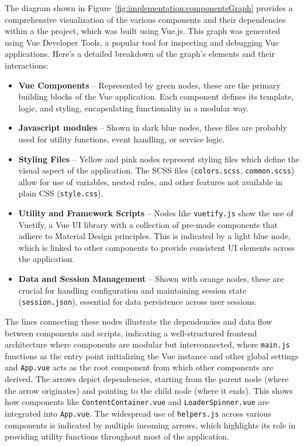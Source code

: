 The diagram shown in Figure~\ref{fig:implementation:componentsGraph} provides a comprehensive visualization of the various components and their dependencies within a the project, which was built using Vue.js. This graph was generated using Vue Developer Tools, a popular tool for inspecting and debugging Vue applications. Here's a detailed breakdown of the graph's elements and their interactions:
\begin{itemize}
    \item \textbf{Vue Components} -- Represented by green nodes, these are the primary building blocks of the Vue application. Each component defines its template, logic, and styling, encapsulating functionality in a modular way.
    \item \textbf{Javascript modules} -- Shown in dark blue nodes, these files are probably used for utility functions, event handling, or service logic.
    \item \textbf{Styling Files} -- Yellow and pink nodes represent styling files which define the visual aspect of the application. The SCSS files (\texttt{colors.scss}, \texttt{common.scss}) allow for use of variables, nested rules, and other features not available in plain CSS (\texttt{style.css}).
    \item \textbf{Utility and Framework Scripts} -- Nodes like \texttt{vuetify.js} show the use of Vuetify, a Vue UI library with a collection of pre-made components that adhere to Material Design principles. This is indicated by a light blue node, which is linked to other components to provide consistent UI elements across the application.
    \item \textbf{Data and Session Management} --  Shown with orange nodes, these are crucial for handling configuration and maintaining session state (\texttt{session.json}), essential for data persistence across user sessions.
\end{itemize}

The lines connecting these nodes illustrate the dependencies and data flow between components and scripts, indicating a well-structured frontend architecture where components are modular but interconnected, where \texttt{main.js} functions as the entry point initializing the Vue instance and other global settings and \texttt{App.vue} acts as the root component from which other components are derived. The arrows depict dependencies, starting from the parent node (where the arrow originates) and pointing to the child node (where it ends). This shows how components like \texttt{ContentContainer.vue} and \texttt{LoaderSpinner.vue} are integrated into \texttt{App.vue}. The widespread use of \texttt{helpers.js} across various components is indicated by multiple incoming arrows, which highlights its role in providing utility functions throughout most of the application.


